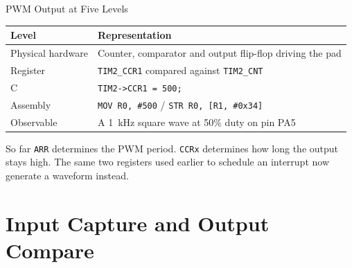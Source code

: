 \documentclass[9pt,aspectratio=169,xcolor=table]{beamer}
\begin{document}
\begin{frame}{PWM Output at Five Levels}
    \begin{center}
    {\small
    \striped
    \begin{tabular}{@{}l R{.65\textwidth}@{}}
        \toprule
        \textbf{Level} & \textbf{Representation} \\
        \midrule
        Physical hardware & Counter, comparator and output flip-flop driving the pad \\
        Register          & \texttt{TIM2\_CCR1} compared against \texttt{TIM2\_CNT} \\
        C                 & \texttt{TIM2->CCR1 = 500;} \\
        Assembly          & \texttt{MOV R0, \#500} / \texttt{STR R0, [R1, \#0x34]} \\
        Observable        & A 1~kHz square wave at 50\% duty on pin PA5 \\
        \bottomrule
    \end{tabular}}
    \end{center}

    \vspace{3mm}
    \begin{block}{So far}
        \texttt{ARR} determines the PWM \alert{period}. \texttt{CCRx}
        determines how long the output stays \alert{high}. The same two
        registers used earlier to schedule an interrupt now generate a
        waveform instead.
    \end{block}
\end{frame}


\section{Input Capture and Output Compare}
\end{document}
